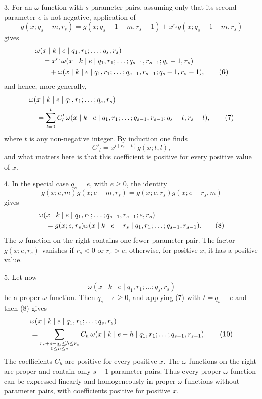 3. For an $\omega$-function with $s$ parameter pairs, assuming only that its second parameter $e$ is not negative, application of
\[
 g(x;q_s-m,r_s)=g(x;q_s-1-m,r_s-1)+x^{r_s}g(x;q_s-1-m,r_s)
\]
gives
\begin{align}
&\omega(x\mid k\mid e\mid q_1,r_1;\ldots;q_s,r_s)\notag\\
&\quad=x^{r_s}\omega(x\mid k\mid e\mid q_1,r_1;\ldots;q_{s-1},r_{s-1};q_s-1,r_s)\notag\\
&\qquad+\omega(x\mid k\mid e\mid q_1,r_1;\ldots;q_{s-1},r_{s-1};q_s-1,r_s-1),
\tag{6}
\end{align}
and hence, more generally,
\begin{align}
&\omega(x\mid k\mid e\mid q_1,r_1;\ldots;q_s,r_s)\notag\\
&\quad=\sum_{l=0}^t C'_l\,
 \omega(x\mid k\mid e\mid q_1,r_1;\ldots;q_{s-1},r_{s-1};q_s-t,r_s-l),
\tag{7}
\end{align}
where $t$ is any non-negative integer. By induction one finds
\[
 C'_l=x^{l(r_s-t)}g(x;t,l),
\]
and what matters here is that this coefficient is positive for every positive value of $x$.

4. In the special case $q_s=e$, with $e\ge0$, the identity
\[
 g(x;e,m)g(x;e-m,r_s)=g(x;e,r_s)g(x;e-r_s,m)
\]
gives
\begin{align}
&\omega(x\mid k\mid e\mid q_1,r_1;\ldots;q_{s-1},r_{s-1};e,r_s)\notag\\
&\quad=g(x;e,r_s)\omega(x\mid k\mid e-r_s\mid q_1,r_1;\ldots;q_{s-1},r_{s-1}).
\tag{8}
\end{align}
The $\omega$-function on the right contains one fewer parameter pair. The factor $g(x;e,r_s)$ vanishes if $r_s<0$ or $r_s>e$; otherwise, for positive $x$, it has a positive value.

5. Let now
\[
 \omega(x\mid k\mid e\mid q_1,r_1;\ldots;q_s,r_s)
\]
be a proper $\omega$-function. Then $q_s-e\ge0$, and applying (7) with $t=q_s-e$ and then (8) gives
\begin{align}
&\omega(x\mid k\mid e\mid q_1,r_1;\ldots;q_s,r_s)\notag\\
&=\sum_{\substack{r_s+e-q_s\le h\le r_s\\0\le h\le e}}
 C_h\,\omega(x\mid k\mid e-h\mid q_1,r_1;\ldots;q_{s-1},r_{s-1}).
\tag{10}
\end{align}
The coefficients $C_h$ are positive for every positive $x$. The $\omega$-functions on the right are proper and contain only $s-1$ parameter pairs. Thus every proper $\omega$-function can be expressed linearly and homogeneously in proper $\omega$-functions without parameter pairs, with coefficients positive for positive $x$.

